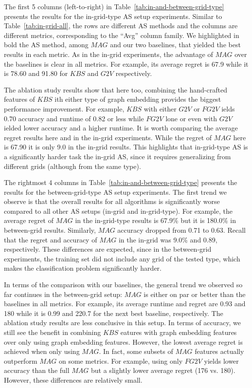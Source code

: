 \documentclass{ecai}
\newcommand{\gtv}[1]{\ensuremath{\textit{G2V}}\xspace}
\newcommand{\fgtv}[1]{\ensuremath{\textit{FG2V}}\xspace}
\newcommand{\kaduri}[1]{\ensuremath{\textit{KBS}}\xspace}
\newcommand{\mapfgas}[1]{\ensuremath{\textit{MAG}}\xspace}
\begin{document}
The first 5 columns (left-to-right) in Table~\ref{tab:in-and-between-grid-type} presents the results for the in-grid-type AS setup experiments. 
Similar to Table~\ref{tab:in-grid-all}, the rows are different AS methods and the columns are different metrics, corresponding to the ``Avg'' column family. 
We highlighted in bold the AS method, among \mapfgas\ and our two baselines,  that yielded the best results in each metric. 
As in the in-grid experiments, the advantage of \mapfgas\ over the baselines is clear in all metrics. For example, its average regret is 67.9 while it is 78.60 and 91.80 for \kaduri\ and \gtv, respectively. 


The ablation study results show that here too, combining the hand-crafted features of \kaduri with either type of graph embedding provides the biggest performance improvement. For example, \kaduri\ with either \gtv\ or \fgtv yields 0.70 accuracy and runtime of 0.82 or less while \fgtv alone or even with \gtv yielded lower accuracy and a higher runtime. It is worth comparing the average regret results here and in the in-grid experiments. While the regret of \mapfgas\ here is 67.90 it is only 9.0 in the in-grid results. This highlights that in-grid-type AS is a significantly harder task the in-grid AS, since it requires generalizing from different grids (although from the same type). 


The rightmost 4 columns in Table~\ref{tab:in-and-between-grid-type} presents the results for the between-grid-type AS setup experiments. 
The first trend we observe is that the overall results for all algorithms is significantly worse compared to all other AS setups (in-grid and in-grid-type). 
For example, the average regret of \mapfgas\ in the in-grid-type results is 67.9\% but it is 180.0\% in between-grid results. Similarly, \mapfgas\ accuracy dropped from 0.71 to 0.63. Recall that the regret and accuracy of \mapfgas\ in the in-grid
was 9.0\% and 0.89, respectively. These differences are expected, since in the between-grid experiments, the training set did not include any grid of the tested type, which makes the classification problem significantly harder. 


In terms of the comparison with our baselines, the general trend we observed so far continues in the between-grid setup: \mapfgas\ is either on par or better than the baselines in all metrics. 
For example, its average runtime and regret are 0.93 and 180 while it is 0.99 and 220.7 for the next best baseline, respectively. 
The ablation study results are less conclusive in this setup. 
In terms of accuracy, we still see the benefit in combining \kaduri features with graph embedding features over only using graph embedding features. However, the lowest average regret is achieved when only using \mapfgas\ . In fact, some subsets of \mapfgas\ features actually outperform \mapfgas\ on some metrics. For example, using only \fgtv\ yields lower accuracy than the full \mapfgas\ but a slightly lower average regret (176 vs. 180). However, these differences are relatively small. 
\end{document}
